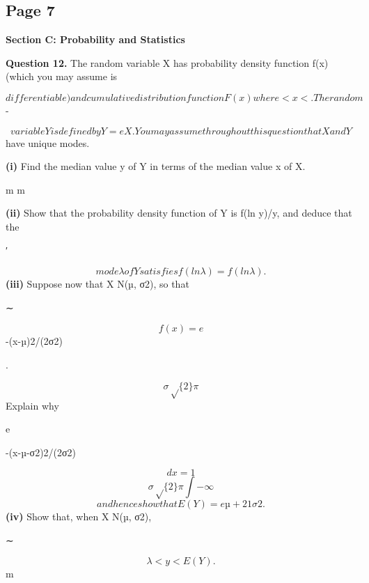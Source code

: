 \documentclass[12pt]{article}
\begin{document}
\subsection*{Page 7}
\begin{flushleft}
\bigskip\textbf{Section C: Probability and Statistics}\par
\bigskip\textbf{Question 12.} The random variable X has probability density function f(x) (which you may assume is\par
\[differentiable) and cumulative distribution function F(x) where < x < . The random\]
-\infty \infty\par
\[variable Y is defined by Y = eX . You may assume throughout this question that X and Y\]
have unique modes.\par
\textbf{(i)} Find the median value y of Y in terms of the median value x of X.\par
m m\par
\textbf{(ii)} Show that the probability density function of Y is f(ln y)/y, and deduce that the\par
′\par
\[mode λ of Y satisfies f (ln λ) = f(ln λ).\]
\textbf{(iii)} Suppose now that X N(µ, σ2), so that\par
∼\par
\[f(x) = e\]
-(x-µ)2/(2σ2)\par
.\par
\[σ\sqrt\{2\}\pi\]
Explain why\par
\infty\par
e\par
-(x-µ-σ2)2/(2σ2)\par
\[dx = 1\]
\[σ\sqrt\{2\}\pi ∫-\infty\]
\[and hence show that E(Y ) = eµ+ 2 1 σ2 .\]
\textbf{(iv)} Show that, when X N(µ, σ2),\par
∼\par
\[λ < y < E(Y ) .\]
m\par
\end{flushleft}
\end{document}
